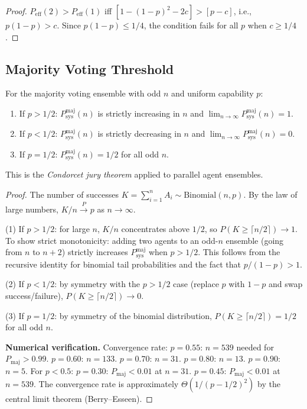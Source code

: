 \begin{proof}
$P_{\mathrm{eff}}(2) > P_{\mathrm{eff}}(1)$ iff $[1-(1-p)^2 - 2c] > [p - c]$, i.e.,
$p(1-p) > c$. Since $p(1-p) \le 1/4$, the condition fails for all $p$ when $c \ge 1/4$.
\end{proof}

\subsection{Majority Voting Threshold}

\begin{theorem}[Majority Voting Phase Transition at $p = 1/2$]
\label{thm:majority-threshold}
For the majority voting ensemble with odd $n$ and uniform capability $p$:
\begin{enumerate}
  \item If $p > 1/2$: $P_{\mathrm{sys}}^{\mathrm{maj}}(n)$ is strictly increasing in $n$
    and $\lim_{n\to\infty} P_{\mathrm{sys}}^{\mathrm{maj}}(n) = 1$.
  \item If $p < 1/2$: $P_{\mathrm{sys}}^{\mathrm{maj}}(n)$ is strictly decreasing in $n$
    and $\lim_{n\to\infty} P_{\mathrm{sys}}^{\mathrm{maj}}(n) = 0$.
  \item If $p = 1/2$: $P_{\mathrm{sys}}^{\mathrm{maj}}(n) = 1/2$ for all odd $n$.
\end{enumerate}
This is the \emph{Condorcet jury theorem} applied to parallel agent ensembles.
\end{theorem}

\begin{proof}
The number of successes $K = \sum_{i=1}^n A_i \sim \mathrm{Binomial}(n, p)$.
By the law of large numbers, $K/n \xrightarrow{P} p$ as $n \to \infty$.

(1) If $p > 1/2$: for large $n$, $K/n$ concentrates above $1/2$, so
$P(K \ge \lceil n/2 \rceil) \to 1$.
To show strict monotonicity: adding two agents to an odd-$n$ ensemble (going from $n$ to $n+2$)
strictly increases $P_{\mathrm{sys}}^{\mathrm{maj}}$ when $p > 1/2$. This follows from the
recursive identity for binomial tail probabilities and the fact that $p/(1-p) > 1$.

(2) If $p < 1/2$: by symmetry with the $p > 1/2$ case (replace $p$ with $1-p$ and swap
success/failure), $P(K \ge \lceil n/2 \rceil) \to 0$.

(3) If $p = 1/2$: by symmetry of the binomial distribution, $P(K \ge \lceil n/2\rceil) = 1/2$
for all odd $n$.

\medskip\noindent
\textbf{Numerical verification.} Convergence rate:
$p=0.55$: $n = 539$ needed for $P_{\mathrm{maj}} > 0.99$.
$p=0.60$: $n = 133$. $p=0.70$: $n = 31$. $p=0.80$: $n = 13$. $p=0.90$: $n = 5$.
For $p < 0.5$: $p=0.30$: $P_{\mathrm{maj}} < 0.01$ at $n = 31$.
$p=0.45$: $P_{\mathrm{maj}} < 0.01$ at $n = 539$.
The convergence rate is approximately $\Theta(1/(p - 1/2)^2)$ by the
central limit theorem (Berry--Esseen).
\end{proof}

